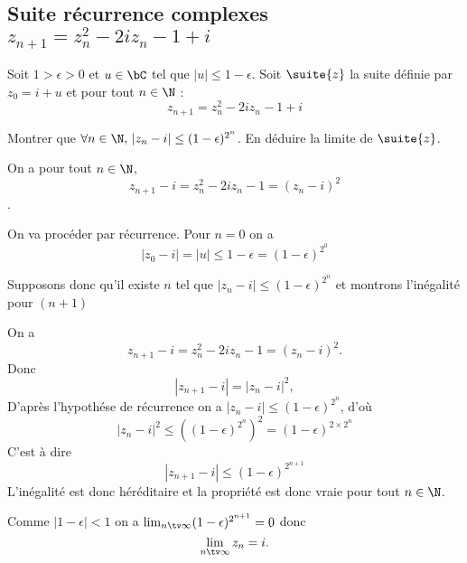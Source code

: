 \subsection{Suite récurrence complexes $z_{n+1} = z_n^2 -2iz_n-1+i$}


\begin{exercice}
Soit $1>\epsilon >0$ et $u\in \bC$ tel que $|u| \leq 1-\epsilon$.
Soit $\suite{z}$ la suite définie par $z_0= i+u$ et pour tout $n\in \N$ :
$$z_{n+1} = z_n^2 -2iz_n-1+i$$

Montrer que $\forall n\in \N,\, |z_n-i|\leq (1-\epsilon)^{2^n}$. En déduire la limite de $\suite{z}$.
\end{exercice}

\begin{correction}
On a pour tout $n\in \N$, 
$$z_{n+1} -i =z_n^2 -2iz_n-1= (z_n-i)^2$$. 

On va procéder par récurrence. Pour $n=0$ on a 
$$|z_0-i |=|u| \leq 1-\epsilon =(1-\epsilon)^{2^0}$$

Supposons donc qu'il existe $n$ tel que $|z_n-i|\leq (1-\epsilon)^{2^n}$  et montrons l'inégalité pour $(n+1)$


On a $$z_{n+1} - i = z_n^2-2iz_n-1 = (z_n -i)^2.$$
Donc 
$$|z_{n+1} - i | =| z_n -i|^2,$$
D'après l'hypothése de récurrence on a 
$| z_n -i| \leq (1-\epsilon)^{2^n}$, d'où
$$| z_n -i|^2 \leq \left((1-\epsilon)^{2^n}\right)^2 =(1-\epsilon)^{2\times 2^{n}}$$
C'est à dire 
$$|z_{n+1} - i | \leq (1-\epsilon)^{2^{n+1}}$$
L'inégalité est donc héréditaire et la propriété est donc vraie pour tout $n\in \N$.

Comme $|1-\epsilon|<1$ on a $\lim_{n\tv \infty}  (1-\epsilon)^{2^{n+1}}=0$ donc 
$$\lim_{n\tv \infty}  z_n = i.$$




\end{correction}